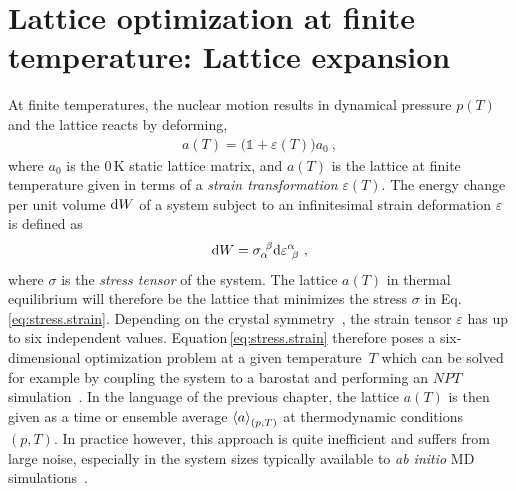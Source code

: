 \section{Lattice optimization at finite temperature: Lattice expansion}
At finite temperatures,
the nuclear motion results in dynamical pressure $p(T)$ and the lattice reacts by deforming,
\begin{align}
a (T) = \bm ( \mathds 1 + \varepsilon (T) \bm ) a_0~,
\label{eq:lattice.T}
\end{align}
where $a_0$ is the 0\,K static lattice matrix, and $a (T)$ is the lattice at finite temperature given in terms of a \emph{strain transformation} $\varepsilon (T)$. 
The energy change per unit volume ${\rm d} W$ of a system subject to an infinitesimal strain deformation $\varepsilon$ is defined as
\begin{align}
\d W = \sigma_{\alpha}^{~\beta} \d \varepsilon^{\alpha}_{~\beta}~,
\label{eq:stress.strain}
\end{align}
where $\sigma$ is the \emph{stress tensor} of the system. The lattice $a(T)$ in thermal equilibrium will therefore be the lattice that minimizes the stress $\sigma$ in Eq.\,\eqref{eq:stress.strain}. Depending on the crystal symmetry~\cite{Nye1985}, the strain tensor $\varepsilon$ has up to six independent values. Equation\,\eqref{eq:stress.strain} therefore poses a six-dimensional optimization problem at a given temperature~$T$ which can be solved for example by coupling the system to a barostat and performing an $NPT$ simulation~. In the language of the previous chapter, the lattice $a(T)$ is then given as a time or ensemble average $\braket{a}_{(p, T)}$ at thermodynamic conditions $(p, T)$. In practice however, this approach is quite inefficient and suffers from large noise, especially in the system sizes typically available to \emph{ab initio} MD simulations~.

